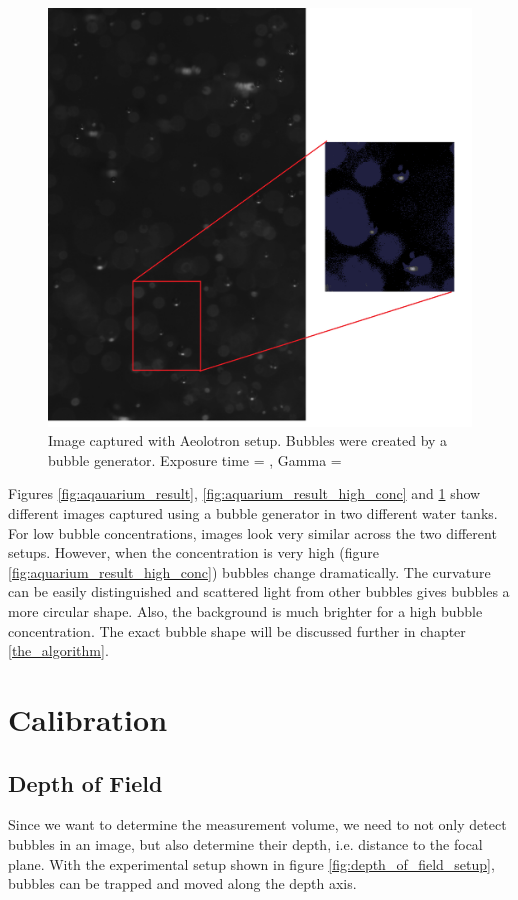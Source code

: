 			\begin{figure}
				\centering
				\includegraphics[scale=0.3]{images/aeolotron_result.png}
				\caption{Image captured with Aeolotron setup. Bubbles were created by a bubble generator.  Exposure time = , Gamma = }
								
				\label{fig:aeolotron_result}
			\end{figure}

			Figures \ref{fig:aqauarium_result}, \ref{fig:aquarium_result_high_conc} and \ref{fig:aeolotron_result} show different images captured using a bubble generator in two different water tanks. For low bubble concentrations, images look very similar across the two different setups. However, when the concentration is very high (figure \ref{fig:aquarium_result_high_conc}) bubbles change dramatically. The curvature can be easily distinguished and scattered light from other bubbles gives bubbles a more circular shape. Also, the background is much brighter for a high bubble concentration. The exact bubble shape will be discussed further in chapter \ref{the_algorithm}.	
	
	
	\section{Calibration}\label{calibration_setup}
		\subsection{Depth of Field}\label{sub:depth_of_field_setup}
			Since we want to determine the measurement volume, we need to not only detect bubbles in an image, but also determine their depth, i.e. distance to the focal plane. With the experimental setup shown in figure \ref{fig:depth_of_field_setup}, bubbles can be trapped and moved along the depth axis. 
			

